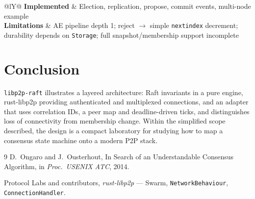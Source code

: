 \documentclass[11pt,a4paper]{article}
\newcommand{\code}[1]{{\def\_{\textunderscore\allowbreak}\texttt{#1}}}
\begin{document}
\begin{table}[H]
\centering
\caption{Compared with production Raft}
\begin{tabularx}{\textwidth}{@{}lY@{}}
\toprule
\textbf{Implemented} & Election, replication, propose, commit events, multi-node example \\
\textbf{Limitations} & AE pipeline depth 1; reject $\rightarrow$ simple \code{next\_index} decrement;
durability depends on \code{Storage}; full snapshot/membership support incomplete \\
\bottomrule
\end{tabularx}
\end{table}

\section{Conclusion}

\code{libp2p-raft} illustrates a layered architecture: Raft invariants in a pure engine, rust-libp2p
providing authenticated and multiplexed connections, and an adapter that uses correlation IDs, a peer
map and deadline-driven ticks, and distinguishes loss of connectivity from membership change. Within
the simplified scope described, the design is a compact laboratory for studying how to map a consensus
state machine onto a modern P2P stack.

\begin{thebibliography}{9}
D.~Ongaro and J.~Ousterhout,
\newblock In Search of an Understandable Consensus Algorithm,
\newblock in \emph{Proc.\ USENIX ATC}, 2014.

Protocol Labs and contributors,
\newblock \emph{rust-libp2p} --- Swarm, \code{NetworkBehaviour},
\code{ConnectionHandler}.
\end{thebibliography}
\end{document}
